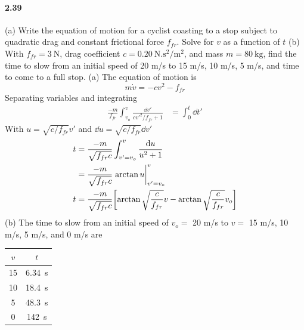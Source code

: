 \documentclass[../problems.tex]{subfiles}
\begin{document}
\paragraph{2.39} (a) Write the equation of motion for a cyclist coasting to a stop subject to 
quadratic drag and constant frictional force $f_{fr}$. Solve for $v$ as a function of $t$ (b) With
$f_{fr} = \qty{3}{\N}$, drag coefficient $c = \qty{0.20}{\N.\s^2\per\m^2}$, and mass $m = \qty{80}
{\kg}$, find the time to slow from an initial speed of 20 m/s to 15 m/s, 10 m/s, 5 m/s, and time
to come to a full stop.
\barh 
(a) The equation of motion is
\begin{equation*}
    m \dot{v} = -cv^2 - f_{fr}
\end{equation*}
Separating variables and integrating
\begin{align*}
    \frac{-m}{f_{fr}} \int_{v_o}^v \frac{\dd{v'}}{cv'^2/f_{fr} + 1} &= \int_0^t \dd{t'}
\end{align*}
With $u = \sqrt{c/f_{fr}}v'$ and $\dd{u} = \sqrt{c/f_{fr}} \dd{v'}$
\begin{align*}
    t &= \frac{-m}{\sqrt{f_{fr}c}} \int_{v'=v_o}^{v} \frac{\dd{u}}{u^2 + 1} \\
    &= \frac{-m}{\sqrt{f_{fr}c}} \eval{\arctan u}_{v'=v_o}^v \\
    t &= \frac{-m}{\sqrt{f_{fr}c}} 
        \quantity[\arctan \sqrt{\frac{c}{f_{fr}}}v - \arctan \sqrt{\frac{c}{f_{fr}}}v_o] \\
\end{align*}
(b) The time to slow from an initial speed of $v_o= $ 20 m/s to $v=$ 15 m/s, 10 m/s, 5 m/s, and 0
m/s are
\begin{center}
    \begin{tabular}{c c}
        $v$ & $t$ \\
        \hline
        15 & \qty{6.34}{\s} \\
        10 & \qty{18.4}{\s} \\
        5 & \qty{48.3}{\s} \\
        0 & \qty{142}{\s} \\
    \end{tabular}
\end{center}
\end{document}

